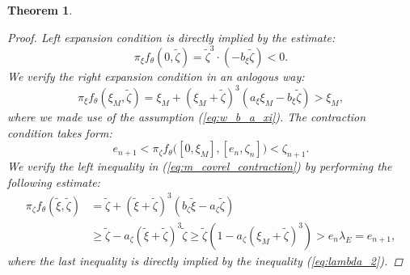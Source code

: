 \documentclass[1p]{article}
\newtheorem{theorem}{Theorem}
\begin{document}
\begin{theorem}
\begin{proof}
        Left expansion condition is directly implied by the estimate:
        \[
            \pi_\xi f_\theta \left( 0,\tilde{\zeta} \right) = \tilde{\zeta}^3 \cdot \left(-b_\xi \tilde{\zeta} \right) < 0.
        \]
        We verify the right expansion condition in an anlogous way:
        \[
            \pi_\xi f_\theta \left( \xi_M,\tilde{\zeta} \right) =
            \xi_M + \left( \xi_M+\tilde{\zeta} \right)^3 \left( a_\xi \xi_M-b_\xi \tilde{\zeta} \right) > \xi_M,
        \]
        where we made use of the assumption (\ref{eq:w_b_a_xi}). The contraction condition takes form:
        \begin{equation}
            \label{eq:m_covrel_contraction}
            e_{n+1} < \pi_\zeta f_\theta \big( [0,\xi_M], [e_n, \zeta_n] \big) < \zeta_{n+1}.
        \end{equation}
        We verify the left inequality in (\ref{eq:m_covrel_contraction}) by performing the following estimate:
        \begin{equation*}
            \begin{split}
                \pi_\zeta f_\theta \left( \tilde{\xi},\tilde{\zeta} \right) &= 
                \tilde{\zeta} + \left(\tilde{\xi}+\tilde{\zeta} \right)^3 \left(b_\zeta \tilde{\xi} - a_\zeta \tilde{\zeta} \right)\\ &\geq 
                \tilde{\zeta} - a_\zeta \left( \tilde{\xi}+\tilde{\zeta} \right)^3 \tilde{\zeta} \geq
                \tilde{\zeta} \left(1 - a_\zeta \left(\xi_M+\tilde{\zeta} \right)^3 \right) >
                e_n \lambda_E = e_{n+1},
            \end{split}
        \end{equation*}
        where the last inequality is directly implied by the inequality (\ref{eq:lambda_2}).
        

\end{proof}
\end{theorem}
\end{document}
